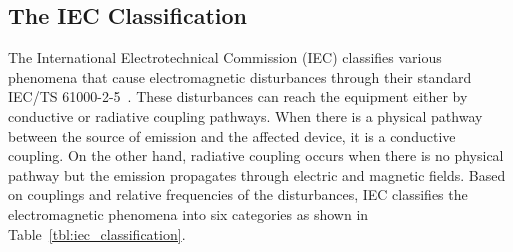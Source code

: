 \subsection{The IEC Classification}
The International Electrotechnical Commission (IEC) classifies various phenomena that cause electromagnetic disturbances through their standard IEC/TS 61000-2-5~\cite{iec_61000}. These disturbances can reach the equipment either by conductive or radiative coupling pathways. When there is a physical pathway between the source of emission and the affected device, it is a conductive coupling. On the other hand, radiative coupling occurs when there is no physical pathway but the emission propagates through electric and magnetic fields. Based on couplings and relative frequencies of the disturbances, IEC classifies the electromagnetic phenomena into six categories as shown in Table~\ref{tbl:iec_classification}.

